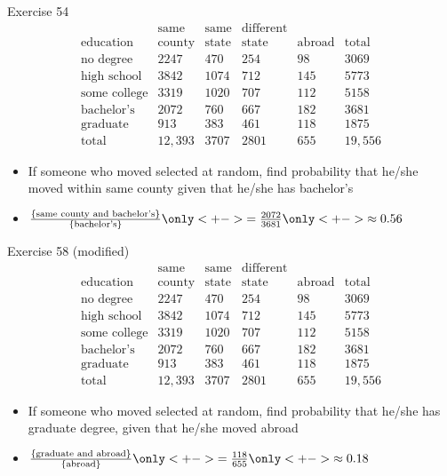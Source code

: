 \documentclass{beamer}
\theoremstyle{definition}
\begin{document}
\begin{frame}{Exercise 54}
\[\begin{array}{r|llll|l}
&\text{same}&\text{same}&\text{different}&&\\
\text{education}&\text{county}
&\text{state}&\text{state}&\text{abroad}&\text{total}\\\hline
\text{no degree}&2247&470&254&98&3069\\
\text{high school}&3842&1074&712&145&5773\\
\text{some college}&3319&1020&707&112&5158\\
\text{bachelor's}&2072&760&667&182&3681\\
\text{graduate}&913&383&461&118&1875\\\hline
\text{total}&12,393&3707&2801&655&19,556
\end{array}\]
\begin{itemize}
\item If someone who moved selected at random, find probability
that he/she moved within same county given that he/she has bachelor's
\item $\frac{\left\{\text{same county and bachelor's}\right\}}
{\left\{\text{bachelor's}\right\}}
\only<+->{=\frac{2072}{3681}}\only<+->{\approx 0.56}$
\end{itemize}
\end{frame}

\begin{frame}{Exercise 58 (modified)}
\[\begin{array}{r|llll|l}
&\text{same}&\text{same}&\text{different}&&\\
\text{education}&\text{county}
&\text{state}&\text{state}&\text{abroad}&\text{total}\\\hline
\text{no degree}&2247&470&254&98&3069\\
\text{high school}&3842&1074&712&145&5773\\
\text{some college}&3319&1020&707&112&5158\\
\text{bachelor's}&2072&760&667&182&3681\\
\text{graduate}&913&383&461&118&1875\\\hline
\text{total}&12,393&3707&2801&655&19,556
\end{array}\]
\begin{itemize}
\item If someone who moved selected at random, find probability
that he/she has graduate degree, given that he/she moved abroad
\item $\frac{\left\{\text{graduate and abroad}\right\}}
{\left\{\text{abroad}\right\}}
\only<+->{=\frac{118}{655}}\only<+->{\approx 0.18}$
\end{itemize}
\end{frame}
\end{document}
